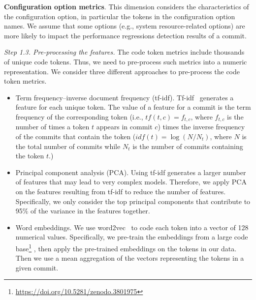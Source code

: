     \textbf{Configuration option metrics}. This dimension considers the characteristics of the configuration option, in particular the tokens in the configuration option names. We assume that some options (e.g., system resource-related options) are more likely to impact the performance regressions detection results of a commit.


\textit{Step 1.3. Pre-processing the features.}
The code token metrics include thousands of unique code tokens. Thus, we need to pre-process such metrics into a numeric representation. We consider three different approaches to pre-process the code token metrics. 
\begin{itemize}
    \item Term frequency–inverse document frequency (tf-idf). Tf-idf~\cite{ramos2003using} generates a feature for each unique token. The value of a feature for a commit is the term frequency of the corresponding token (i.e., $tf(t,c) = f_{t,c}$, where $f_{t,c}$ is the number of times a token $t$ appears in commit $c$) times the inverse frequency of the commits that contain the token ($idf(t) = \log{(N/N_t)}$, where $N$ is the total number of commits while $N_t$ is the number of commits containing the token $t$.) %
    
    \item Principal component analysis (PCA). Using tf-idf generates a larger  number of features that may lead to very complex models. Therefore, we apply PCA~\cite{wold1987principal} on the features resulting from tf-idf to reduce the number of features. Specifically, we only consider the top principal components that contribute to 95\% of the variance in the features together.
    
    \item Word embeddings. We use word2vec~\cite{Mikolov:2013:DRW:2999792.2999959,Mikolov2013} to code each token into a vector of 128 numerical values. Specifically, we pre-train the embeddings from a large code base\footnote{\url{https://doi.org/10.5281/zenodo.3801975}} , then apply the pre-trained embeddings on the tokens in our data. Then we use a mean aggregation of the vectors representing the tokens in a given commit.
    
    
    
\end{itemize}


